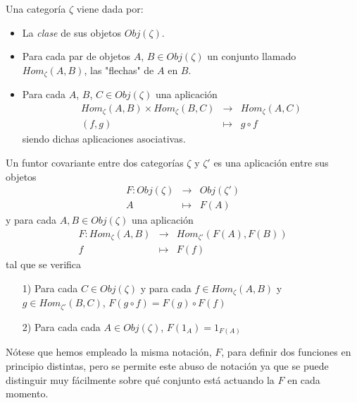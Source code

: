 \documentclass[../main.tex]{subfiles}
\begin{document}
Una categoría $\zeta$ viene dada por:\begin{itemize}
    \item La \textit{clase} de sus objetos $Obj(\zeta)$.
    \item Para cada par de objetos $A$, $B\in Obj(\zeta)$ un conjunto llamado $Hom_{\zeta}(A,B)$, las "flechas" de $A$ en $B$.
    \item Para cada $A$, $B$, $C\in Obj(\zeta)$ una aplicación
    $$\begin{array}{rcl}
    Hom_{\zeta}(A,B)\times Hom_{\zeta}(B,C)&\longrightarrow&Hom_{\zeta}(A,C)\\
    (f,g)&\longmapsto&g\circ f
    \end{array}$$
    siendo dichas aplicaciones asociativas.
\end{itemize}
\begin{definition} Un funtor covariante entre dos categorías $\zeta$ y $\zeta '$ es una aplicación entre sus objetos
 $$\begin{array}{rcl}
    F: Obj(\zeta)&\longrightarrow&Obj(\zeta ')\\
    A&\longmapsto&F(A)
    \end{array}$$
y para cada $A,B\in Obj(\zeta)$ una aplicación
$$\begin{array}{rcl}
    F: Hom_{\zeta}(A,B)&\longrightarrow&Hom_{\zeta '}(F(A),F(B))\\
    f&\longmapsto&F(f)
    \end{array}$$
tal que se verifica \begin{itemize}
    \item [1)] Para cada $C\in Obj(\zeta)$ y para cada $f\in Hom_{\zeta}(A,B)$ y $g\in Hom_{\zeta '}(B,C)$, $F(g\circ f)=F(g)\circ F(f)$
    \item [2)] Para cada cada $A\in Obj(\zeta)$, $F(1_A)=1_{F(A)}$
\end{itemize}
\end{definition}
Nótese que hemos empleado la misma notación, $F$, para definir dos funciones en principio distintas, pero se permite este abuso de notación ya que se puede distinguir muy fácilmente sobre qué conjunto está actuando la $F$ en cada momento.
\end{document}
